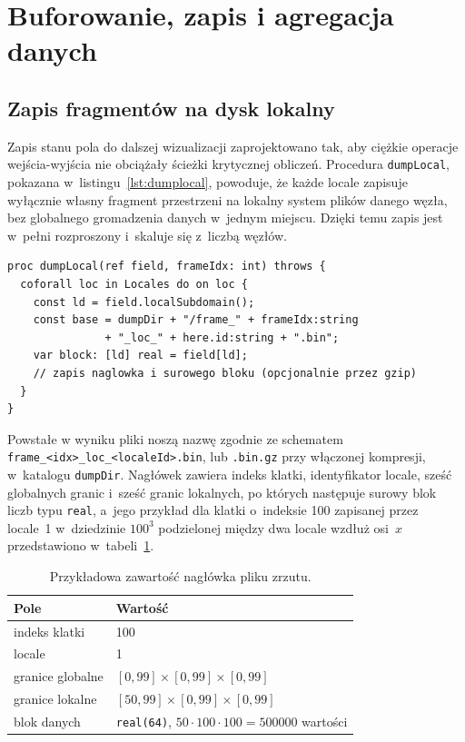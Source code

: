 \section{Buforowanie, zapis i agregacja danych}
\label{sec:zapis}

\subsection{Zapis fragmentów na dysk lokalny}

Zapis stanu pola do dalszej wizualizacji zaprojektowano tak, aby ciężkie operacje wejścia-wyjścia nie obciążały ścieżki krytycznej obliczeń. 
Procedura \texttt{dumpLocal}, pokazana w~listingu~\ref{lst:dumplocal}, powoduje, że każde locale zapisuje wyłącznie własny fragment przestrzeni na lokalny system plików danego węzła, bez globalnego gromadzenia danych w~jednym miejscu. Dzięki temu zapis jest w~pełni rozproszony i~skaluje się z~liczbą węzłów.

\begin{lstlisting}[language=Chapel, caption={Rozproszony zapis: każdy locale zapisuje własny podblok lokalnie.}, label={lst:dumplocal}]
proc dumpLocal(ref field, frameIdx: int) throws {
  coforall loc in Locales do on loc {
    const ld = field.localSubdomain();
    const base = dumpDir + "/frame_" + frameIdx:string
               + "_loc_" + here.id:string + ".bin";
    var block: [ld] real = field[ld];
    // zapis naglowka i surowego bloku (opcjonalnie przez gzip)
  }
}
\end{lstlisting}

Powstałe w wyniku pliki noszą nazwę zgodnie ze schematem \texttt{frame\_<idx>\_loc\_<localeId>.bin}, lub \texttt{.bin.gz} przy włączonej kompresji, w~katalogu \texttt{dumpDir}. 
Nagłówek zawiera indeks klatki, identyfikator locale, sześć globalnych granic i~sześć granic lokalnych, po których następuje surowy blok liczb typu \texttt{real}, a~jego przykład dla klatki o~indeksie \num{100} zapisanej przez locale~\num{1} w~dziedzinie $100^3$ podzielonej między dwa locale wzdłuż osi~$x$ przedstawiono w~tabeli~\ref{tab:dumpheader}.

\begin{table}[H]
  \centering
  \caption{Przykładowa zawartość nagłówka pliku zrzutu.}
  \label{tab:dumpheader}
  \begin{tabular}{ll}
    \toprule
    Pole & Wartość \\
    \midrule
    indeks klatki & \num{100} \\
    locale & \num{1} \\
    granice globalne & $[0,99]\times[0,99]\times[0,99]$ \\
    granice lokalne & $[50,99]\times[0,99]\times[0,99]$ \\
    blok danych & \texttt{real(64)}, $50\cdot100\cdot100=\num{500000}$ wartości \\
    \bottomrule
  \end{tabular}
\end{table}

